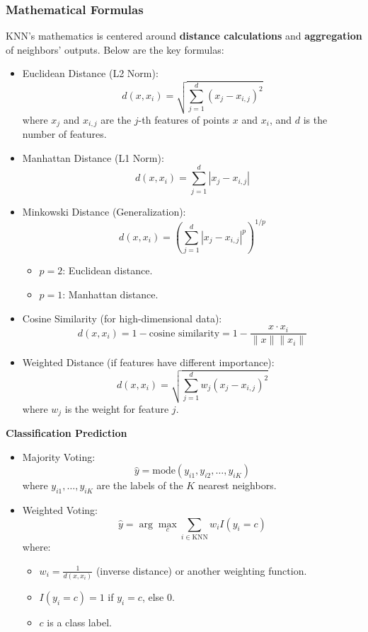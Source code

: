 \subsubsection{Mathematical Formulas}\text{}

\smallskip
KNN's mathematics is centered around \textbf{distance calculations} and \textbf{aggregation} of neighbors' outputs.
Below are the key formulas:

\begin{itemize}
    \item Euclidean Distance (L2 Norm):
        \[d(x, x_i) = \sqrt{\sum_{j=1}^d (x_j - x_{i,j})^2}\]
        where $x_j$ and $x_{i,j}$ are the $j$-th features of points $x$ and $x_i$, and $d$ is the number of features.

    \item Manhattan Distance (L1 Norm):
        \[d(x, x_i) = \sum_{j=1}^d |x_j - x_{i,j}|\]

    \item Minkowski Distance (Generalization):
        \[d(x, x_i) = \left( \sum_{j=1}^d |x_j - x_{i,j}|^p \right)^{1/p}\]

    \begin{itemize}
        \item $p = 2$: Euclidean distance.
        \item $p = 1$: Manhattan distance.
    \end{itemize}

    \item Cosine Similarity (for high-dimensional data):
        \[d(x, x_i) = 1 - \text{cosine similarity} = 1 - \frac{x \cdot x_i}{\|x\| \|x_i\|}\]

    \item Weighted Distance (if features have different importance):
        \[d(x, x_i) = \sqrt{\sum_{j=1}^d w_j (x_j - x_{i,j})^2}\]
        where $w_j$ is the weight for feature $j$.
\end{itemize}

\smallskip
\textbf{Classification Prediction}

\begin{itemize}
    \item Majority Voting:
        \[\hat{y} = \text{mode}(y_{i1}, y_{i2}, \dots, y_{iK})\]
        where $y_{i1}, \dots, y_{iK}$ are the labels of the $K$ nearest neighbors.

    \item Weighted Voting:
        \[\hat{y} = \arg\max_c \sum_{i \in \text{KNN}} w_i I(y_i = c)\]
        where:
    \begin{itemize}
        \item $w_i = \frac{1}{d(x, x_i)}$ (inverse distance) or another weighting function.
        \item $I(y_i = c) = 1$ if $y_i = c$, else 0.
        \item $c$ is a class label.
    \end{itemize}
\end{itemize}

